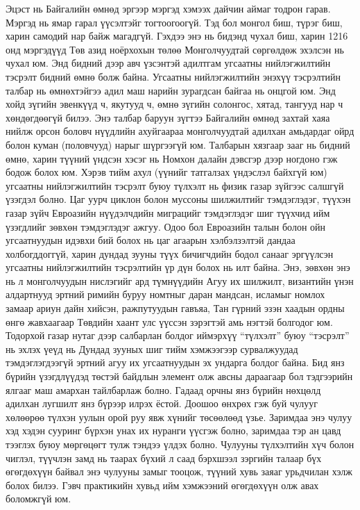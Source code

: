 Эцэст нь Байгалийн өмнөд эргээр мэргэд хэмээх дайчин аймаг тодрон гарав. Мэргэд нь ямар гарал үүсэлтэйг тогтоогоогүй. Тэд бол монгол биш, түрэг биш, харин самодий нар байж магадгүй. Гэхдээ энэ нь бидэнд чухал биш, харин 1216 онд мэргэдүүд Төв азид ноёрхохын төлөө Монголчуудтай сөргөлдөж эхэлсэн нь чухал юм. Энд бидний дээр авч үзсэнтэй адилтгам угсаатны нийлэгжилтийн тэсрэлт бидний өмнө болж байна. Угсаатны нийлэгжилтийн энэхүү тэсрэлтийн талбар нь өмнөхтэйгээ адил маш нарийн зурагдсан байгаа нь онцгой юм. Энд хойд зүгийн эвенкүүд ч, якутууд ч, өмнө зүгийн солонгос, хятад, тангууд нар ч хөндөгдөөгүй билээ. Энэ талбар баруун зүгтээ Байгалийн өмнөд захтай хаяа нийлж орсон боловч нүүдлийн ахуйгаараа монголчуудтай адилхан амьдардаг ойрд болон куман (половчууд) нарыг шүргээгүй юм. Талбарын хязгаар зааг нь бидний өмнө, харин түүний үндсэн хэсэг нь Номхон далайн дэвсгэр дээр ногдоно гэж бодож болох юм. Хэрэв тийм ахул (үүнийг татгалзах үндэслэл байхгүй юм) угсаатны нийлэгжилтийн тэсрэлт буюу түлхэлт нь физик газар зүйгээс салшгүй үзэгдэл болно. Цаг уурч циклон болон муссоны шилжилтийг тэмдэглэдэг, түүхэн газар зүйч Евроазийн нүүдэлчдийн миграцийг тэмдэглэдэг шиг түүхчид ийм үзэгдлийг зөвхөн тэмдэглэдэг ажгуу. Одоо бол Евроазийн талын болон ойн угсаатнуудын идэвхи бий болох нь цаг агаарын хэлбэлзэлтэй дандаа холбогддоггүй, харин дундад зууны түүх бичигчдийн бодол санааг эргүүлсэн угсаатны нийлэгжилтийн тэсрэлтийн үр дүн болох нь илт байна. Энэ, зөвхөн энэ нь л монголчуудын нислэгийг ард түмнүүдийн Агуу их шилжилт, византийн үнэн алдартнууд эртний римийн буруу номтныг даран мандсан, исламыг номлох замаар ариун дайн хийсэн, ражпутуудын гавъяа, Тан гүрний эзэн хаадын ордны өнгө жавхаагаар Төвдийн хаант улс үүссэн зэрэгтэй амь нэгтэй болгодог юм. Тодорхой газар нутаг дээр салбарлан болдог иймэрхүү “түлхэлт” буюу “тэсрэлт” нь эхлэх үеүд нь Дундад зууных шиг тийм хэмжээгээр сурвалжуудад тэмдэглэгдээгүй эртний агуу их угсаатнуудын эх ундарга болдог байна.
Бид янз бүрийн үзэгдлүүдэд төстэй байдлын элемент олж авсны дараагаар бол тэдгээрийн ялгааг маш амархан тайлбарлаж болно. Гадаад орчны янз бүрийн нөхцөлд адилхан лугшилт янз бүрээр илрэх ёстой. Доошоо өнхрөх гэж буй чулууг хөлөөрөө түлхэн уулын орой руу явж хүнийг төсөөлөөд үзье. Заримдаа энэ чулуу хэд хэдэн сууринг бүрхэн унах их нуранги үүсгэж болно, заримдаа тэр ан цавд тээглэх буюу мөргөцөгт тулж тэндээ үлдэх болно. Чулууны түлхэлтийн хүч болон чиглэл, түүчлэн замд нь таарах бүхий л саад бэрхшээл зэргийн талаар бүх өгөгдөхүүн байвал энэ чулууны замыг тооцож, түүний хувь заяаг урьдчилан хэлж болох билээ. Гэвч практикийн хувьд ийм хэмжээний өгөгдөхүүн олж авах боломжгүй юм.
